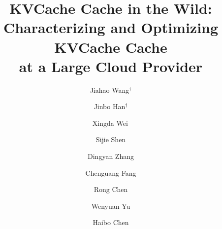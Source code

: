 \documentclass[10pt,sigplan,letterpaper,twocolumn]{article}
\begin{document}
\title{\Large \bf{KVCache Cache in the Wild: Characterizing and Optimizing KVCache Cache \\ at a Large Cloud Provider}}

\setlength{\affilsep}{0.3em}
\author[1]{Jiahao Wang$^\dagger$}
\author[1]{Jinbo Han$^\dagger$}
\author[1]{Xingda Wei\,{\Envelope}}
\author[2]{Sijie Shen}
\author[1]{Dingyan Zhang}
\author[2]{Chenguang Fang}
\author[1]{Rong Chen}
\author[2]{Wenyuan Yu}
\author[1]{Haibo Chen}

\date{}
\maketitle

\def\thefootnote{$\dagger$}
\def\thefootnote{\Envelope}

\renewcommand{\thefootnote}{[\arabic{footnote}]}

\frenchspacing









%







 

\balance

\small{


}

\appendix

\clearpage


%
\end{document}
